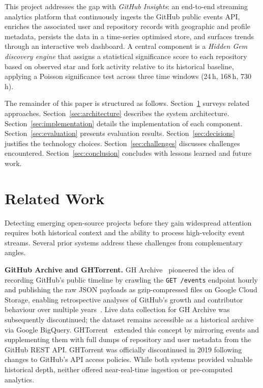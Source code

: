 \documentclass[sigconf]{acmart}
\begin{document}
This project addresses the gap with \textit{GitHub Insights}:
an end-to-end streaming analytics platform that continuously ingests the
GitHub public events API, enriches the associated user and repository records
with geographic and profile metadata, persists the data in a time-series
optimised store, and surfaces trends through an interactive web dashboard. A
central component is a \textit{Hidden Gem discovery engine} that assigns a
statistical significance score to each repository based on observed star and
fork activity relative to its historical baseline, applying a Poisson
significance test across three time windows (24\,h, 168\,h, 730\,h).

The remainder of this paper is structured as follows.
Section~\ref{sec:related} surveys related approaches.
Section~\ref{sec:architecture} describes the system architecture.
Section~\ref{sec:implementation} details the implementation of each component.
Section~\ref{sec:evaluation} presents evaluation results.
Section~\ref{sec:decisions} justifies the technology choices.
Section~\ref{sec:challenges} discusses challenges encountered.
Section~\ref{sec:conclusion} concludes with lessons learned and future work.

\section{Related Work}
\label{sec:related}

Detecting emerging open-source projects before they gain widespread attention
requires both historical context and the ability to process high-velocity event
streams. Several prior systems address these challenges from complementary
angles.

\textbf{GitHub Archive and GHTorrent.}
GH Archive~\cite{gharchive} pioneered the idea of recording GitHub's public
timeline by crawling the \texttt{GET /events} endpoint hourly and publishing
the raw JSON payloads as gzip-compressed files on Google Cloud Storage, enabling
retrospective analyses of GitHub's growth and contributor behaviour over multiple
years~\cite{lamarque2022github}. Live data collection for GH Archive was
subsequently discontinued; the dataset remains accessible as a historical archive
via Google BigQuery. GHTorrent~\cite{ghtorrent} extended this concept by
mirroring events and supplementing them with full dumps of repository and user
metadata from the GitHub REST API. GHTorrent was officially discontinued in 2019
following changes to GitHub's API access policies. While both systems provided
valuable historical depth, neither offered near-real-time ingestion or
pre-computed analytics.
\end{document}
